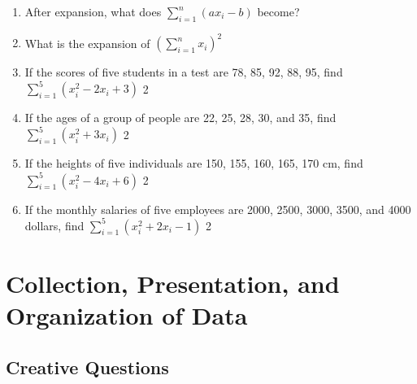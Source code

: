 \documentclass[a4paper,oneside]{book}
\begin{document}
\begin{enumerate}
\item After expansion, what does 
$\displaystyle \sum_{i=1}^n \left( ax_i-b \right)$ become?

\item What is the expansion of $\displaystyle \left( \sum_{i=1}^n x_i\right)^2$

\item 
If the scores of five students in a test are 78, 85, 92, 88, 95, 
find $\displaystyle \sum_{i=1}^5 (x_i^2 - 2x_i + 3)$ \hfill 2

\item 
If the ages of a group of people are 22, 25, 28, 30, and 35, 
find $\displaystyle \sum_{i=1}^5 (x_i^2 + 3x_i)$ \hfill 2

\item 
If the heights of five individuals are 150, 155, 160, 165, 170 cm, 
find $\displaystyle \sum_{i=1}^5 (x_i^2 - 4x_i + 6)$ \hfill 2

\item 
If the monthly salaries of five employees are 2000, 2500, 3000, 3500, and 4000 
dollars, find $\displaystyle \sum_{i=1}^5 (x_i^2 + 2x_i - 1)$ \hfill 2


\end{enumerate}

\chapter{Collection, Presentation, and Organization of Data} 

\section{Creative Questions}
\end{document}
